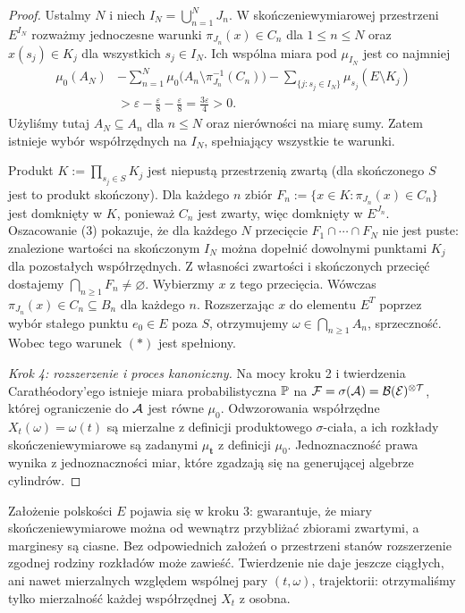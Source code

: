 \begin{proof}
Ustalmy $N$ i niech $I_N=\bigcup_{n=1}^N J_n$.
W skończeniewymiarowej przestrzeni $E^{I_N}$
rozważmy jednoczesne warunki
$\pi_{J_n}(x)\in C_n$ dla $1\le n\le N$
oraz $x(s_j)\in K_j$ dla wszystkich $s_j\in I_N$.
Ich wspólna miara pod $\mu_{I_N}$ jest co najmniej
\[
\begin{aligned}
\mu_0(A_N)
&-\sum_{n=1}^N \mu_0\big(A_n\setminus\pi_{J_n}^{-1}(C_n)\big)
-\sum_{\{j:s_j\in I_N\}}\mu_{s_j}(E\setminus K_j)\\
&>\varepsilon-\frac\varepsilon8-\frac\varepsilon8
=\frac{3\varepsilon}{4}>0.
\end{aligned}
\tag{3}
\]
Użyliśmy tutaj $A_N\subseteq A_n$ dla $n\le N$ oraz
nierówności na miarę sumy. Zatem istnieje wybór
współrzędnych na $I_N$, spełniający wszystkie te warunki.

Produkt $K:=\prod_{s_j\in S}K_j$ jest niepustą przestrzenią
zwartą (dla skończonego $S$ jest to produkt skończony).
Dla każdego $n$ zbiór
$F_n:=\{x\in K:\pi_{J_n}(x)\in C_n\}$
jest domknięty w $K$, ponieważ $C_n$ jest zwarty,
więc domknięty w $E^{J_n}$. Oszacowanie (3) pokazuje,
że dla każdego $N$ przecięcie $F_1\cap\cdots\cap F_N$
nie jest puste: znalezione wartości na skończonym $I_N$
można dopełnić dowolnymi punktami $K_j$ dla
pozostałych współrzędnych. Z własności zwartości
i skończonych przecięć dostajemy
$\bigcap_{n\ge1}F_n\ne\varnothing$.
Wybierzmy $x$ z tego przecięcia. Wówczas
$\pi_{J_n}(x)\in C_n\subseteq B_n$ dla każdego $n$.
Rozszerzając $x$ do elementu $E^T$ poprzez wybór
stałego punktu $e_0\in E$ poza $S$, otrzymujemy
$\omega\in\bigcap_{n\ge1}A_n$, sprzeczność.
Wobec tego warunek $(*)$ jest spełniony.

\emph{Krok 4: rozszerzenie i proces kanoniczny.}
Na mocy kroku 2 i twierdzenia Carathéodory'ego istnieje
miara probabilistyczna $\mathbb{P}$ na
$\mathcal{F}=\sigma(\cal A)=\mathcal{B}(E)^{\otimes T}$,
której ograniczenie do $\cal A$ jest równe $\mu_0$.
Odwzorowania współrzędne $X_t(\omega)=\omega(t)$ są
mierzalne z definicji produktowego $\sigma$-ciała,
a ich rozkłady skończeniewymiarowe są zadanymi
$\mu_{\mathbf t}$ z definicji $\mu_0$.
Jednoznaczność prawa wynika z jednoznaczności miar,
które zgadzają się na generującej algebrze cylindrów.
\end{proof}

\begin{uwaga}
Założenie polskości $E$ pojawia się w kroku 3: gwarantuje,
że miary skończeniewymiarowe można od wewnątrz
przybliżać zbiorami zwartymi, a marginesy są ciasne.
Bez odpowiednich założeń o przestrzeni stanów
rozszerzenie zgodnej rodziny rozkładów może zawieść.
Twierdzenie nie daje jeszcze ciągłych, ani nawet
mierzalnych względem wspólnej pary $(t,\omega)$,
trajektorii: otrzymaliśmy tylko mierzalność każdej
współrzędnej $X_t$ z osobna.
\end{uwaga}

